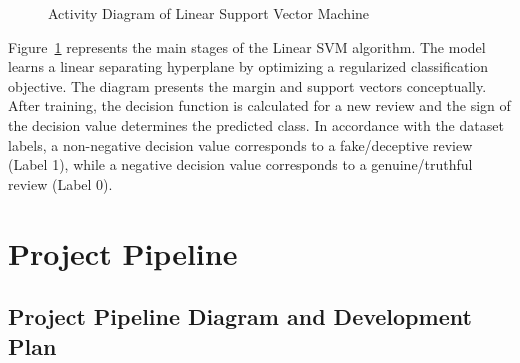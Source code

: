 \documentclass[12pt,a4paper]{report}
\begin{document}
\begin{figure}[H]

\caption{Activity Diagram of Linear Support Vector Machine}
\label{fig:svm_activity}
\end{figure}

Figure~\ref{fig:svm_activity} represents the main stages of the Linear SVM algorithm. The model learns a linear separating hyperplane by optimizing a regularized classification objective. The diagram presents the margin and support vectors conceptually. After training, the decision function is calculated for a new review and the sign of the decision value determines the predicted class. In accordance with the dataset labels, a non-negative decision value corresponds to a fake/deceptive review (Label 1), while a negative decision value corresponds to a genuine/truthful review (Label 0).

\section{Project Pipeline}

\subsection{Project Pipeline Diagram and Development Plan}
\end{document}
